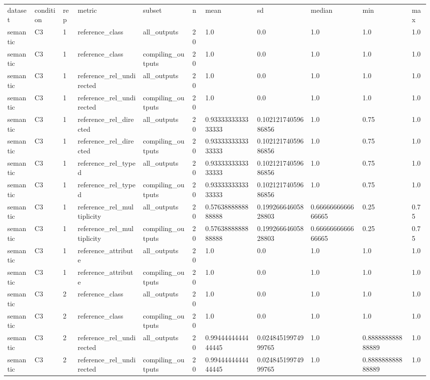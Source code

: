 \begin{tabular}{lllllllllll}
dataset & condition & rep & metric & subset & n & mean & sd & median & min & max \\
semantic & C3 & 1 & reference\_class & all\_outputs & 20 & 1.0 & 0.0 & 1.0 & 1.0 & 1.0 \\
semantic & C3 & 1 & reference\_class & compiling\_outputs & 20 & 1.0 & 0.0 & 1.0 & 1.0 & 1.0 \\
semantic & C3 & 1 & reference\_rel\_undirected & all\_outputs & 20 & 1.0 & 0.0 & 1.0 & 1.0 & 1.0 \\
semantic & C3 & 1 & reference\_rel\_undirected & compiling\_outputs & 20 & 1.0 & 0.0 & 1.0 & 1.0 & 1.0 \\
semantic & C3 & 1 & reference\_rel\_directed & all\_outputs & 20 & 0.9333333333333333 & 0.10212174059686856 & 1.0 & 0.75 & 1.0 \\
semantic & C3 & 1 & reference\_rel\_directed & compiling\_outputs & 20 & 0.9333333333333333 & 0.10212174059686856 & 1.0 & 0.75 & 1.0 \\
semantic & C3 & 1 & reference\_rel\_typed & all\_outputs & 20 & 0.9333333333333333 & 0.10212174059686856 & 1.0 & 0.75 & 1.0 \\
semantic & C3 & 1 & reference\_rel\_typed & compiling\_outputs & 20 & 0.9333333333333333 & 0.10212174059686856 & 1.0 & 0.75 & 1.0 \\
semantic & C3 & 1 & reference\_rel\_multiplicity & all\_outputs & 20 & 0.5763888888888888 & 0.19926664605828803 & 0.6666666666666665 & 0.25 & 0.75 \\
semantic & C3 & 1 & reference\_rel\_multiplicity & compiling\_outputs & 20 & 0.5763888888888888 & 0.19926664605828803 & 0.6666666666666665 & 0.25 & 0.75 \\
semantic & C3 & 1 & reference\_attribute & all\_outputs & 20 & 1.0 & 0.0 & 1.0 & 1.0 & 1.0 \\
semantic & C3 & 1 & reference\_attribute & compiling\_outputs & 20 & 1.0 & 0.0 & 1.0 & 1.0 & 1.0 \\
semantic & C3 & 2 & reference\_class & all\_outputs & 20 & 1.0 & 0.0 & 1.0 & 1.0 & 1.0 \\
semantic & C3 & 2 & reference\_class & compiling\_outputs & 20 & 1.0 & 0.0 & 1.0 & 1.0 & 1.0 \\
semantic & C3 & 2 & reference\_rel\_undirected & all\_outputs & 20 & 0.9944444444444445 & 0.02484519974999765 & 1.0 & 0.888888888888889 & 1.0 \\
semantic & C3 & 2 & reference\_rel\_undirected & compiling\_outputs & 20 & 0.9944444444444445 & 0.02484519974999765 & 1.0 & 0.888888888888889 & 1.0 \\

\end{tabular}
